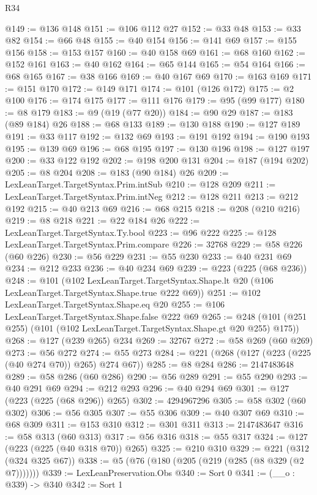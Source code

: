\begin{lexlean}{R34}
\begin{coremodule}
@149 := @136 @148
@151 := @106 @112 @27
@152 := @33 @48
@153 := @33 @82
@154 := @66 @48
@155 := @40 @154
@156 := @141 @69
@157 := @155 @156
@158 := @153 @157
@160 := @40 @158 @69
@161 := @68 @160
@162 := @152 @161
@163 := @40 @162
@164 := @65 @144
@165 := @54 @164
@166 := @68 @165
@167 := @38 @166
@169 := @40 @167 @69
@170 := @163 @169
@171 := @151 @170
@172 := @149 @171
@174 := @101 (@126 @172)
@175 := @2 @100
@176 := @174 @175
@177 := @111 @176
@179 := @95 (@99 @177)
@180 := @8 @179
@183 := @9 (@19 (@77 @20))
@184 := @90 @29
@187 := @183 (@89 @184) @26
@188 := @68 @133
@189 := @130 @188
@190 := @127 @189
@191 := @33 @117
@192 := @132 @69
@193 := @191 @192
@194 := @190 @193
@195 := @139 @69
@196 := @68 @195
@197 := @130 @196
@198 := @127 @197
@200 := @33 @122 @192
@202 := @198 @200 @131
@204 := @187 (@194 @202)
@205 := @8 @204
@208 := @183 (@90 @184) @26
@209 := LexLeanTarget.TargetSyntax.Prim.intSub
@210 := @128 @209
@211 := LexLeanTarget.TargetSyntax.Prim.intNeg
@212 := @128 @211
@213 := @212 @192
@215 := @40 @213 @69
@216 := @68 @215
@218 := @208 (@210 @216)
@219 := @8 @218
@221 := @22 @184 @26
@222 := LexLeanTarget.TargetSyntax.Ty.bool
@223 := @96 @222
@225 := @128 LexLeanTarget.TargetSyntax.Prim.compare
@226 := 32768
@229 := @58 @226 (@60 @226)
@230 := @56 @229
@231 := @55 @230
@233 := @40 @231 @69
@234 := @212 @233
@236 := @40 @234 @69
@239 := @223 (@225 (@68 @236))
@248 := @101
    (@102
      LexLeanTarget.TargetSyntax.Shape.lt
      @20
      (@106 LexLeanTarget.TargetSyntax.Shape.true @222 @69))
@251 := @102 LexLeanTarget.TargetSyntax.Shape.eq @20
@255 := @106 LexLeanTarget.TargetSyntax.Shape.false @222 @69
@265 := @248 (@101 (@251 @255) (@101 (@102 LexLeanTarget.TargetSyntax.Shape.gt @20 @255) @175))
@268 := @127 (@239 @265) @234
@269 := 32767
@272 := @58 @269 (@60 @269)
@273 := @56 @272
@274 := @55 @273
@284 := @221 (@268 (@127 (@223 (@225 (@40 @274 @70)) @265) @274 @67))
@285 := @8 @284
@286 := 2147483648
@289 := @58 @286 (@60 @286)
@290 := @56 @289
@291 := @55 @290
@293 := @40 @291 @69
@294 := @212 @293
@296 := @40 @294 @69
@301 := @127 (@223 (@225 (@68 @296)) @265)
@302 := 4294967296
@305 := @58 @302 (@60 @302)
@306 := @56 @305
@307 := @55 @306
@309 := @40 @307 @69
@310 := @68 @309
@311 := @153 @310
@312 := @301 @311
@313 := 2147483647
@316 := @58 @313 (@60 @313)
@317 := @56 @316
@318 := @55 @317
@324 := @127 (@223 (@225 (@40 @318 @70)) @265)
@325 := @210 @310
@329 := @221 (@312 (@324 @325 @67))
@338 := @5 (@76 (@180 (@205 (@219 (@285 (@8 @329 (@2 @7)))))))
@339 := LexLeanPreservation.Obs
@340 := Sort 0
@341 := (__o : @339) -> @340
@342 := Sort 1

\end{coremodule}
\end{lexlean}
